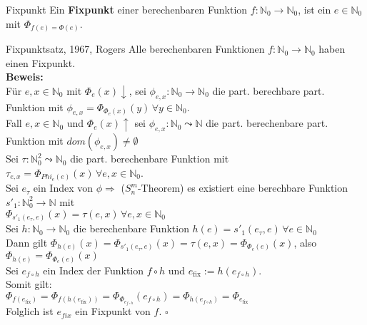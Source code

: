 \begin{defn}{Fixpunkt}
    Ein \textbf{Fixpunkt} einer berechenbaren Funktion $f: \mathbb{N}_0 \rightarrow \mathbb{N}_0$, ist ein 
    $e \in \mathbb{N}_0$ mit $\Phi_{f(e) = \Phi(e)}$.
\end{defn}

\begin{satz}{Fixpunktsatz, 1967, Rogers}
    Alle berechenbaren Funktionen $f: \mathbb{N}_0 \rightarrow \mathbb{N}_0$ haben einen Fixpunkt. \\

    \textbf{Beweis:} \\
    Für $e,x \in \mathbb{N}_0$ mit $\Phi_e(x)\downarrow$, sei $\phi_{e,x} : \mathbb{N}_0 \rightarrow \mathbb{N}_0$ die 
    part. berechbare part. Funktion mit $\phi_{e,x} = \Phi_{\Phi_e(x)}(y) \, \forall y \in \mathbb{N}_0$. \\
    Fall $e,x \in \mathbb{N}_0$ und $\Phi_e(x)\uparrow$ sei $\phi_{e,x}: \mathbb{N}_0 \leadsto \mathbb{N}$ die part. berechenbare part.
    Funktion mit $dom(\phi_{e,x}) \neq \emptyset$ \\

    Sei $\tau : \mathbb{N}_0^2 \leadsto \mathbb{N}_0$ die part. berechenbare Funktion mit  $\tau_{e,x} = \Phi_{Phi_e(e)}(x) \,
    \forall e,x \in \mathbb{N}_0$. \\

    Sei $e_\tau$ ein Index von $\phi \Rightarrow$ ($S^m_n$-Theorem) es existiert eine berechbare Funktion
    $s'_1: \mathbb{N}_0^2 \rightarrow \mathbb{N}$ mit \\
    $\Phi_{s'_1(e_\tau,e)}(x) = \tau(e,x) \, \forall e,x \in \mathbb{N}_0$ \\

    Sei $h: \mathbb{N}_0 \rightarrow \mathbb{N}_0$ die berechenbare Funktion $h(e) = s'_1(e_\tau,e) \, \forall e \in \mathbb{N}_0$ \\
    Dann gilt $\Phi_{h(e)}(x) = \Phi_{s'_1(e_\tau,e)}(x) = \tau(e,x) = \Phi_{\Phi_e(e)}(x)$, also \\
    $\Phi_{h(e)} = \Phi_{\Phi_e(e)}(x)$ \\

    Sei $e_{f \circ h}$ ein Index der Funktion $f \circ h$ und $e_{\text{fix}}:=h(e_{f \circ h})$. \\
    Somit gilt: \\
    $\Phi_{f(e_{\text{fix}})} = \Phi_{f(h(e_{\text{fix}}))} = \Phi_{\Phi_{e_{f \circ h}}}(e_{f \circ h}) = \Phi_{h(e_{f \circ h})} = \Phi_{e_{\text{fix}}}$ \\

    Folglich ist $e_{fix}$ ein Fixpunkt von $f$. $\square$
\end{satz}

